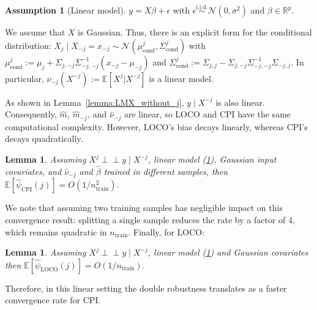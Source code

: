\documentclass{article}
\theoremstyle{plain}
\newtheorem{lemma}[theorem]{Lemma}
\theoremstyle{definition}
\newtheorem{assumption}[theorem]{Assumption}
\theoremstyle{remark}
\newcommand{\e}[1]{\mathbb{E}\left[#1\right]  } %
\newcommand{\indep}{\perp\!\!\!\perp}
\begin{document}
%
\begin{assumption}[Linear model]$y=X\beta + \epsilon$ with $\epsilon\overset{\mathrm{i.i.d.}}{\sim}\mathcal{N}(0, \sigma^2)$ and $\beta\in\mathbb{R}^p$.\label{ass:LM}
\end{assumption}
%
We assume that $X$ is Gaussian. Thus, there is an explicit form for the conditional distribution: $X_{j}\mid X_{-j}=x_{-j}\sim \mathcal{N}(\mu^j_\mathrm{cond}, \Sigma^j_\mathrm{cond})$ 
with $\mu^j_\mathrm{cond}:=\mu_{j}+\Sigma_{j, -j}\Sigma^{-1}_{-j, -j}(x_{-j}-\mu_{-j})$ and $\Sigma^j_\mathrm{cond}:=\Sigma_{j, j}-\Sigma_{j,-j}\Sigma^{-1}_{-j, -j}\Sigma_{-j, j}$. In particular,
$\nu_{-j}(X^{-j}):=\e{X^j|X^{-j}}$ is a linear model. 


As shown in Lemma~\ref{lemma:LMX_without_j}, $y \mid X^{-j}$ is also linear. Consequently, $\widehat{m}$, $\widehat{m}_{-j}$, and $\widehat{\nu}_{-j}$ are linear, so LOCO and CPI have the same computational complexity. However, LOCO’s bias decays linearly, whereas CPI’s decays quadratically.


\begin{lemma}\label{lemm:doubl-rob-LM}
Assuming $X^j\indep y\mid X^{-j}$, linear model (\ref{ass:LM}), Gaussian input covariates, and $\widehat{\nu}_{-j}$ and $\widehat{\beta}$ trained in different samples, then $\e{\widehat{\psi}_\mathrm{CPI}(j)}=O(1/n_\mathrm{train}^2).$
\end{lemma}
%
%
We note that assuming two training samples has negligible impact on this convergence result: splitting a single sample reduces the rate by a factor of 4, which remains quadratic in $n_\mathrm{train}$. Finally, for LOCO:
%
\begin{lemma}
 Assuming $X^j\indep y\mid X^{-j}$, linear model (\ref{ass:LM}) and Gaussian covariates then $\e{\widehat{\psi}_\mathrm{LOCO}(j)}=O(1/n_\mathrm{train}).$
\label{lemma:bias-LOCO-linear}
\end{lemma}
%
Therefore, in this linear setting the double robustness translates as a faster convergence rate for CPI.
\end{document}
